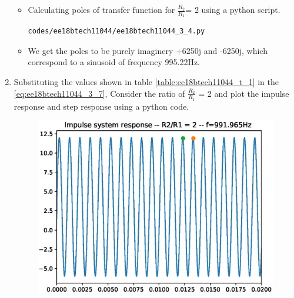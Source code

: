 \begin{enumerate}[label=\arabic*.,ref=\theenumi]
\solution

\begin{itemize}
\item Calculating poles of transfer function for $\frac{R_2}{R_1}$= 2 using a python script.
\begin{lstlisting}
codes/ee18btech11044/ee18btech11044_3_4.py
\end{lstlisting}
\item We get the poles to be purely imaginery +6250j and -6250j, which correspond to a sinusoid of frequency  995.22Hz. 
\end{itemize}

\item Substituting the values shown in table \ref{table:ee18btech11044_t_1} in the   \eqref{eq:ee18btech11044_3_7}, Consider the ratio of $\frac{R_2}{R_1}$ = 2 and plot the impulse response and step response using a python code.
\renewcommand{\thefigure}{\theenumi.\arabic{figure}}
\begin{figure}[!ht]
\centering
\includegraphics[width=\columnwidth]{./figs/ee18btech11044/ee18btech11044_3_6.eps}
\caption{}
\label{fig:ee18btech11044_3_6}
\end{figure}


\end{enumerate}
